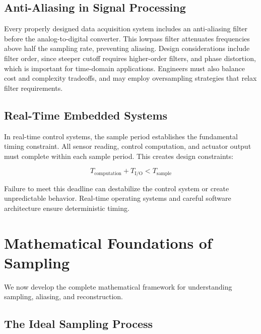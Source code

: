 \subsection{Anti-Aliasing in Signal Processing}
\label{subsec:antialiasing}

Every properly designed data acquisition system includes an anti-aliasing filter before the analog-to-digital converter. This lowpass filter attenuates frequencies above half the sampling rate, preventing aliasing. Design considerations include filter order, since steeper cutoff requires higher-order filters, and phase distortion, which is important for time-domain applications. Engineers must also balance cost and complexity tradeoffs, and may employ oversampling strategies that relax filter requirements.

\subsection{Real-Time Embedded Systems}
\label{subsec:realtime}

In real-time control systems, the sample period establishes the fundamental timing constraint. All sensor reading, control computation, and actuator output must complete within each sample period. This creates design constraints:

\begin{equation}
T_{\text{computation}} + T_{\text{I/O}} < T_{\text{sample}}
\label{eq:realtime_constraint}
\end{equation}

Failure to meet this deadline can destabilize the control system or create unpredictable behavior. Real-time operating systems and careful software architecture ensure deterministic timing.

\section{Mathematical Foundations of Sampling}
\label{sec:math_foundations}

We now develop the complete mathematical framework for understanding sampling, aliasing, and reconstruction.

\subsection{The Ideal Sampling Process}
\label{subsec:ideal_sampling}

